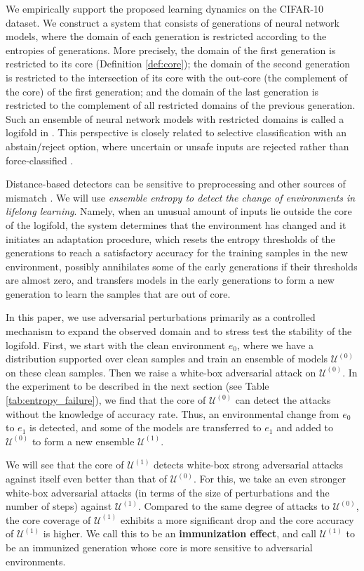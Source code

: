 \documentclass{article}
\theoremstyle{plain}
\theoremstyle{definition}
\theoremstyle{remark}
\newcommand{\cU}{\mathcal{U}}
\begin{document}
We empirically support the proposed learning dynamics on the CIFAR-10 dataset.
We construct a system that consists of generations of neural network models, where the domain of each generation is restricted according to the entropies of generations.  
More precisely, the domain of the first generation is restricted to its core (Definition \ref{def:core}); 
the domain of the second generation is restricted to the intersection of its core with the out-core (the complement of the core) of the first generation;
and the domain of the last generation is restricted to the complement of all restricted domains of the previous generation.  
Such an ensemble of neural network models with restricted domains is called a logifold in \cite{Jung-Lau2,Jung-Lau}. This perspective is closely related to selective classification with an abstain/reject option, where uncertain or unsafe inputs are rejected rather than force-classified \cite{CARL, SDIM, CPR}.

Distance-based detectors can be sensitive to preprocessing and other sources of mismatch \cite{Mahalanobis}. We will use \emph{ensemble entropy to detect the change of environments in lifelong learning}. Namely, when an unusual amount of inputs lie outside the core of the logifold, the system determines that the environment has changed and it initiates an adaptation procedure, which resets the entropy thresholds of the generations to reach a satisfactory accuracy for the training samples in the new environment, possibly annihilates some of the early generations if their thresholds are almost zero, and transfers models in the early generations to form a new generation to learn the samples that are out of core. 

In this paper, we use adversarial perturbations primarily as a controlled mechanism to expand the observed domain and to stress test the stability of the logifold.
First, we start with the clean environment $e_0$, where we have a distribution supported over clean samples and train an ensemble of models $\cU^{(0)}$ on these clean samples.  Then we raise a white-box adversarial attack on $\cU^{(0)}$. In the experiment to be described in the next section (see Table \ref{tab:entropy_failure}), we find that the core of $\cU^{(0)}$ can detect the attacks without the knowledge of accuracy rate. Thus, an environmental change from $e_0$ to $e_1$ is detected, and some of the models are transferred to $e_1$ and added to $\cU^{(0)}$ to form a new ensemble $\cU^{(1)}$.

We will see that the core of $\cU^{(1)}$ detects white-box strong adversarial attacks against itself even better than that of $\cU^{(0)}$. For this, we take an even stronger white-box adversarial attacks (in terms of the size of perturbations and the number of steps) against $\cU^{(1)}$. 
Compared to the same degree of attacks to $\cU^{(0)}$, the core coverage of $\cU^{(1)}$ exhibits a more significant drop and the core accuracy of $\cU^{(1)}$ is higher. We call this to be an \textbf{immunization effect}, and call $\cU^{(1)}$ to be an immunized generation whose core is more sensitive to adversarial environments. 
\end{document}
